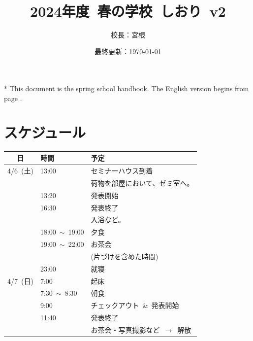 \documentclass[unicode,a4paper,11pt]{ltjsarticle}
\title{
    2024年度\ 春の学校\ しおり\ v2
}
\author{
  校長：宮根
}
\date{最終更新：\today}
\begin{document}
\maketitle

* This document is the spring school handbook. The English version begins from page \pageref{eng_page}.

\tableofcontents



\clearpage

\section{スケジュール}

\begin{center}
      \begin{tabular}{cll}\hline
            日        & 時間                 & 予定                                      \\ \hline
            4/6\ (土) & 13:00                & セミナーハウス到着                        \\
                      &                      & 荷物を部屋において、ゼミ室へ。            \\
                      & 13:20                & 発表開始                                  \\
                      & 16:30                & 発表終了                                  \\
                      &                      & 入浴など。                                \\
                      & 18:00\ $\sim$\ 19:00 & 夕食                                      \\
                      & 19:00\ $\sim$\ 22:00 & お茶会                                    \\
                      &                      & (片づけを含めた時間)                      \\
                      & 23:00                & 就寝                                      \\ \hline
            4/7\ (日) & 7:00                 & 起床                                      \\
                      & 7:30\ $\sim$\  8:30  & 朝食                                      \\
                      & 9:00                 & チェックアウト\ \&\ 発表開始              \\
                      & 11:40                & 発表終了                                  \\
                      &                      & お茶会・写真撮影など\ $\rightarrow$\ 解散 \\ \hline
      \end{tabular}
\end{center}
\end{document}
